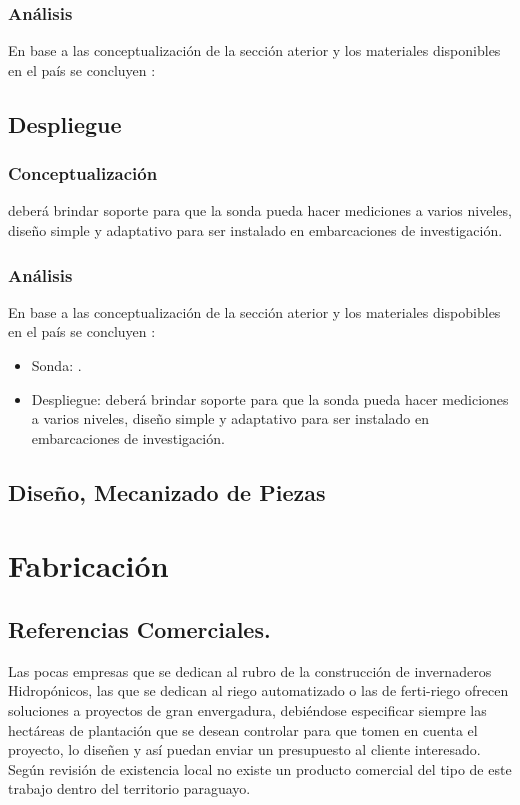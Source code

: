 \subsubsection{An\'alisis}
En base a las conceptualizaci\'on de la secci\'on aterior y los materiales disponibles en el pa\'is se concluyen  :


\subsection{Despliegue}
\subsubsection{Conceptualizaci\'on}

deber\'a brindar soporte para que la sonda pueda hacer mediciones a varios niveles, dise\~no simple y adaptativo para ser instalado en embarcaciones de investigaci\'on.

\subsubsection{An\'alisis}
En base a las conceptualizaci\'on de la secci\'on aterior y los materiales dispobibles en el pa\'is se concluyen  :
\begin{itemize}
    \item Sonda: .
    \item Despliegue: deber\'a brindar soporte para que la sonda pueda hacer mediciones a varios niveles, dise\~no simple y adaptativo para ser instalado en embarcaciones de investigaci\'on.
\end{itemize}

\subsection{Diseño, Mecanizado de Piezas}



\section{Fabricaci\'on}









         

\subsection{Referencias Comerciales.}
Las pocas empresas que se dedican al rubro de la construcción de invernaderos Hidropónicos, las que se dedican al riego automatizado o las de ferti-riego ofrecen soluciones a proyectos de gran envergadura, debiéndose especificar siempre las hectáreas de plantación que se desean controlar para que tomen en cuenta el proyecto, lo diseñen y así puedan enviar un presupuesto al cliente interesado.
Según revisión de existencia local no existe un producto comercial del tipo de este trabajo dentro del territorio paraguayo.\textbf{}





